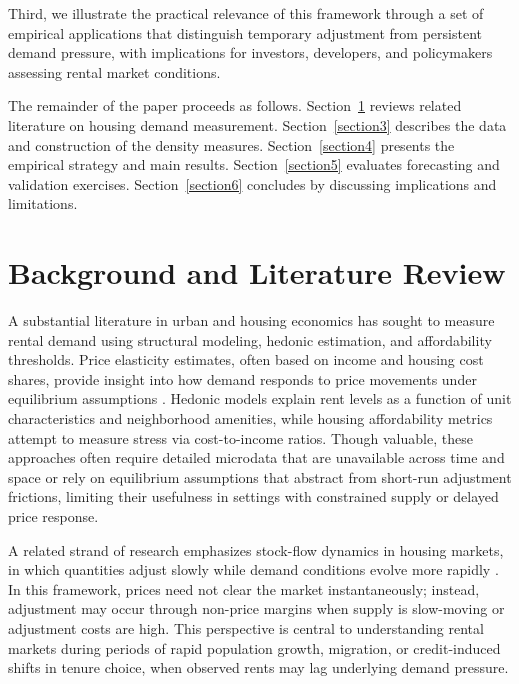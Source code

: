 \documentclass[pdflatex,sn-apa]{sn-jnl}%
\theoremstyle{thmstyleone}%
\theoremstyle{thmstyletwo}%
\theoremstyle{thmstylethree}%
\begin{document}
Third, we illustrate the practical relevance of this framework through a set of 
empirical applications that distinguish temporary adjustment from persistent demand 
pressure, with implications for investors, developers, and policymakers assessing 
rental market conditions.

The remainder of the paper proceeds as follows. Section~\ref{section2}  reviews related literature on housing demand measurement. Section~\ref{section3}  describes the data and construction of the density measures. Section~\ref{section4} presents the empirical strategy and main results. Section~\ref{section5} evaluates forecasting and validation exercises. Section~\ref{section6} concludes by discussing implications and limitations.

\section{Background and Literature Review}\label{section2}

A substantial literature in urban and housing economics has sought to measure rental
demand using structural modeling, hedonic estimation, and affordability thresholds.
Price elasticity estimates, often based on income and housing cost shares, provide
insight into how demand responds to price movements under equilibrium assumptions
\cite{green2002measuring, malpezzi1996rent}. Hedonic models explain rent levels as a
function of unit characteristics and neighborhood amenities, while housing affordability
metrics attempt to measure stress via cost-to-income ratios. Though valuable, these
approaches often require detailed microdata that are unavailable across time and space
or rely on equilibrium assumptions that abstract from short-run adjustment frictions,
limiting their usefulness in settings with constrained supply or delayed price response.

A related strand of research emphasizes stock-flow dynamics in housing markets, in
which quantities adjust slowly while demand conditions evolve more rapidly
\cite{wheaton1991realestate, goodman1992rental}. In this framework, prices need not
clear the market instantaneously; instead, adjustment may occur through non-price
margins when supply is slow-moving or adjustment costs are high. This perspective is
central to understanding rental markets during periods of rapid population growth,
migration, or credit-induced shifts in tenure choice, when observed rents may lag
underlying demand pressure.
\end{document}
